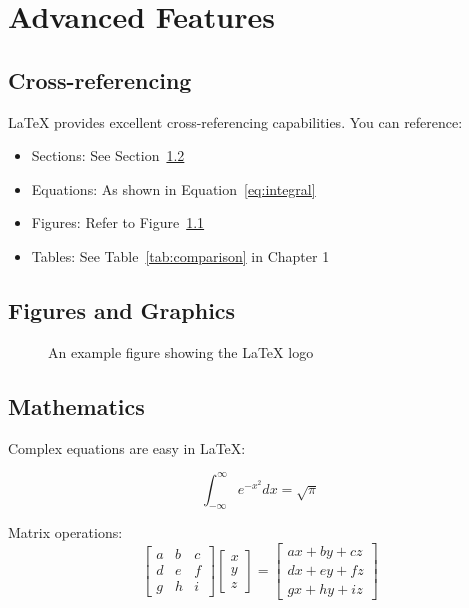 \chapter{Advanced Features}

\section{Cross-referencing}
\LaTeX{} provides excellent cross-referencing capabilities. You can reference:

\begin{itemize}
    \item Sections: See Section~\ref{sec:figures}
    \item Equations: As shown in Equation~\ref{eq:integral}
    \item Figures: Refer to Figure~\ref{fig:example}
    \item Tables: See Table~\ref{tab:comparison} in Chapter 1
\end{itemize}

\section{Figures and Graphics}\label{sec:figures}

\begin{figure}[H]
\centering
\caption{An example figure showing the LaTeX logo}
\label{fig:example}
\end{figure}

\section{Mathematics}
Complex equations are easy in \LaTeX:

\begin{equation}
\int_{-\infty}^{\infty} e^{-x^2} dx = \sqrt{\pi}
\label{eq:integral}
\end{equation}

Matrix operations:
\[
\begin{bmatrix}
a & b & c \\
d & e & f \\
g & h & i
\end{bmatrix}
\begin{bmatrix}
x \\
y \\
z
\end{bmatrix}
=
\begin{bmatrix}
ax + by + cz \\
dx + ey + fz \\
gx + hy + iz
\end{bmatrix}
\]

